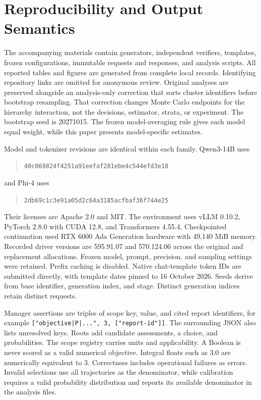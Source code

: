 \documentclass{svproc}
\begin{document}
\section{Reproducibility and Output Semantics}
\label{app:reproducibility}
The accompanying materials contain generators, independent verifiers, templates,
frozen configurations, immutable requests and responses, and analysis scripts.
All reported tables and figures are generated from complete local records.
Identifying repository links are omitted for anonymous review. Original analyses
are preserved alongside an analysis-only correction that sorts cluster identifiers
before bootstrap resampling. That correction changes Monte Carlo endpoints for
the hierarchy interaction, not the decisions, estimator, strata, or experiment.
The bootstrap seed is 20271015. The frozen model-averaging rule gives each model
equal weight, while this paper presents model-specific estimates.

Model and tokenizer revisions are identical within each family. Qwen3-14B uses
\begin{quote}\small\texttt{40c069824f4251a91eefaf281ebe4c544efd3e18}\end{quote}
and Phi-4 uses
\begin{quote}\small\texttt{2db69c1c3e91a05d2c64a3185acfbaf36f744e25}\end{quote}
Their licenses are Apache 2.0 and MIT. The environment uses vLLM 0.10.2,
PyTorch 2.8.0 with CUDA 12.8, and Transformers 4.55.4. Checkpointed continuation
used RTX 6000 Ada Generation hardware with 49,140 MiB memory. Recorded driver
versions are 595.91.07 and 570.124.06 across the original and replacement
allocations. Frozen model, prompt, precision, and sampling settings were retained.
Prefix caching is disabled. Native chat-template token IDs are submitted directly,
with template dates pinned to 16 October 2026. Seeds derive from base identifier,
generation index, and stage. Distinct generation indices retain distinct requests.

Manager assertions are triples of scope key, value, and cited report identifiers,
for example \texttt{["objective|P|...", 3, ["report-id"]]}. The surrounding
JSON also lists unresolved keys. Roots add candidate assessments, a choice, and
probabilities. The scope registry carries units and applicability. A Boolean is
never scored as a valid numerical objective. Integral floats such as 3.0 are
numerically equivalent to 3. Correctness includes operational failures as errors.
Invalid selections use all trajectories as the denominator, while calibration
requires a valid probability distribution and reports its available denominator
in the analysis files.
\end{document}
